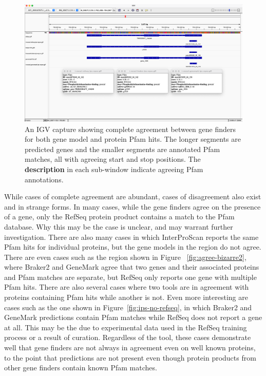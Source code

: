 \begin{figure}[h!]
  \centering
  \includegraphics[width=\textwidth]{figures/igv/ips-basic-agree.png}
  \caption[Agreeing Pfam matches]{An IGV capture showing complete
    agreement between gene finders for both gene model and protein
    Pfam hits. The longer segments are predicted genes and the smaller
    segments are annotated Pfam matches, all with agreeing start and
    stop positions. The \textbf{description} in each sub-window indicate
    agreeing Pfam annotations.}\label{fig:basic-agree}
\end{figure}

While cases of complete agreement are abundant, cases of disagreement
also exist and in strange forms. In many cases, while the gene finders
agree on the presence of a gene, only the RefSeq protein product
contains a match to the Pfam database. Why this may be the case is
unclear, and may warrant further investigation. There are also many
cases in which InterProScan reports the same Pfam hits for individual
proteins, but the gene models in the region do not agree. There are
even cases such as the region shown in Figure
~\ref{fig:agree-bizarre2}, where Braker2 and GeneMark agree that two
genes and their associated proteins and Pfam matches are separate, but
RefSeq only reports one gene with multiple Pfam hits. There are also
several cases where two tools are in agreement with proteins
containing Pfam hits while another is not. Even more interesting are
cases such as the one shown in Figure~\ref{fig:ips-no-refseq}, in
which Braker2 and GeneMark predictions contain Pfam matches while
RefSeq does not report a gene at all. This may be the due to
experimental data used in the RefSeq training process or a result of
curation. Regardless of the tool, these cases demonstrate well that
gene finders are not always in agreement even on well known proteins,
to the point that predictions are not present even though protein
products from other gene finders contain known Pfam matches.

